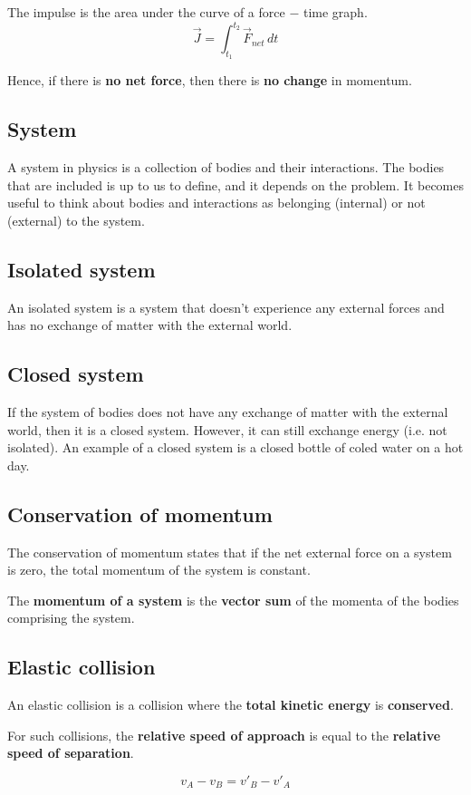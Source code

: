 \documentclass[11pt]{article}
\begin{document}
The impulse is the area under the curve of a force \(-\) time graph.
\[\vec{J} = \int_{t_1}^{t_2} \vec{F}_{net} \, dt\]

Hence, if there is \textbf{no net force}, then there is \textbf{no change} in momentum.
\subsection{System}
\label{sec:org4d3acb0}
A system in physics is a collection of bodies and their interactions. The bodies that are included is up to us to define, and it depends on the problem. It becomes useful to think about bodies and interactions as belonging (internal) or not (external) to the system.
\subsection{Isolated system}
\label{sec:org82f9030}
An isolated system is a system that doesn't experience any external forces and has no exchange of matter with the external world.
\subsection{Closed system}
\label{sec:orgb74255e}
If the system of bodies does not have any exchange of matter with the external world, then it is a closed system. However, it can still exchange energy (i.e. not isolated). An example of a closed system is a closed bottle of coled water on a hot day.
\subsection{Conservation of momentum}
\label{sec:org9161124}
The conservation of momentum states that if the net external force on a system is zero, the total momentum of the system is constant.


The \textbf{momentum of a system} is the \textbf{vector sum} of the momenta of the bodies comprising the system.
\subsection{Elastic collision}
\label{sec:org66ccb47}
An elastic collision is a collision where the \textbf{total kinetic energy} is \textbf{conserved}.


For such collisions, the \textbf{relative speed of approach} is equal to the \textbf{relative speed of separation}.

\[v_A - v_B = v'_B - v'_A\]
\end{document}
